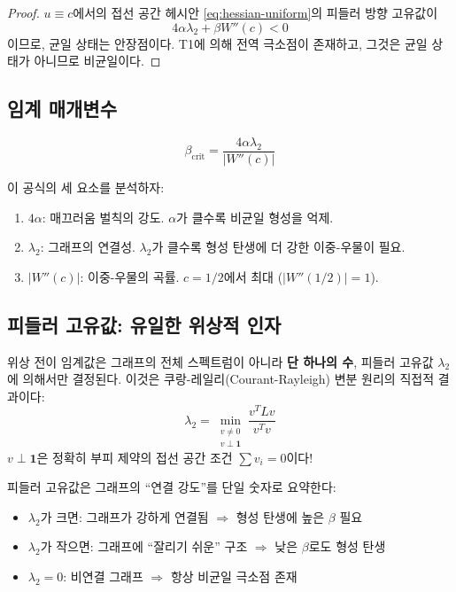 \begin{proof}
$u \equiv c$에서의 접선 공간 헤시안 \eqref{eq:hessian-uniform}의 피들러 방향 고유값이
\begin{equation}
    4\alpha\lambda_2 + \beta W''(c) < 0
\end{equation}
이므로, 균일 상태는 안장점이다. T1에 의해 전역 극소점이 존재하고, 그것은 균일 상태가 아니므로 비균일이다.
\end{proof}

\subsection{임계 매개변수}

\begin{equation}
    \beta_{\mathrm{crit}} = \frac{4\alpha\lambda_2}{|W''(c)|}
    \label{eq:beta-crit}
\end{equation}

이 공식의 세 요소를 분석하자:
\begin{enumerate}
    \item \textbf{$4\alpha$}: 매끄러움 벌칙의 강도. $\alpha$가 클수록 비균일 형성을 억제.
    \item \textbf{$\lambda_2$}: 그래프의 연결성. $\lambda_2$가 클수록 형성 탄생에 더 강한 이중-우물이 필요.
    \item \textbf{$|W''(c)|$}: 이중-우물의 곡률. $c = 1/2$에서 최대 ($|W''(1/2)| = 1$).
\end{enumerate}

\subsection{피들러 고유값: 유일한 위상적 인자}

\begin{tcolorbox}[colback=blue!5, colframe=blue!50!black, title=핵심 통찰: 스펙트럴 보편성]
위상 전이 임계값은 그래프의 전체 스펙트럼이 아니라 \textbf{단 하나의 수}, 피들러 고유값 $\lambda_2$에 의해서만 결정된다. 이것은 쿠랑-레일리(Courant-Rayleigh) 변분 원리의 직접적 결과이다:
\begin{equation}
    \lambda_2 = \min_{\substack{v \neq 0 \\ v \perp \mathbf{1}}} \frac{v^T L v}{v^T v}
\end{equation}
$v \perp \mathbf{1}$은 정확히 부피 제약의 접선 공간 조건 $\sum v_i = 0$이다!
\end{tcolorbox}

피들러 고유값은 그래프의 ``연결 강도''를 단일 숫자로 요약한다:
\begin{itemize}
    \item $\lambda_2$가 크면: 그래프가 강하게 연결됨 $\Rightarrow$ 형성 탄생에 높은 $\beta$ 필요
    \item $\lambda_2$가 작으면: 그래프에 ``잘리기 쉬운'' 구조 $\Rightarrow$ 낮은 $\beta$로도 형성 탄생
    \item $\lambda_2 = 0$: 비연결 그래프 $\Rightarrow$ 항상 비균일 극소점 존재
\end{itemize}

